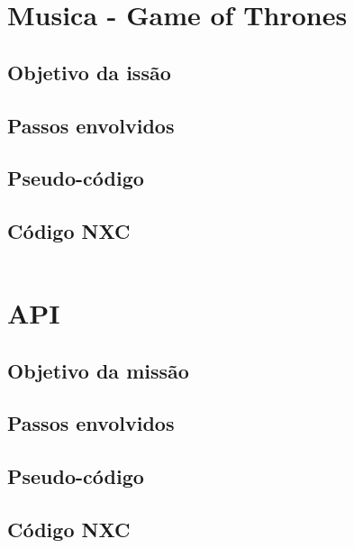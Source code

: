 \documentclass{article}
\begin{document}
\newpage
\section{Musica - Game of Thrones}
	\subsection{Objetivo da issão}
	\subsection{Passos envolvidos}
	\subsection{Pseudo-código}
	\subsection{Código NXC}
		\inputminted[linenos, frame = single]{c}{../GameOfThrones.nxc}

\newpage
\section{API}
	\subsection{Objetivo da missão}
	\subsection{Passos envolvidos}
	\subsection{Pseudo-código}
	\subsection{Código NXC}
		\inputminted[linenos, frame = single]{c}{../theBugAPI.c}
		
		\inputminted[linenos, frame = single]{c}{../theBugAPI.h}

\newpage
\end{document}
